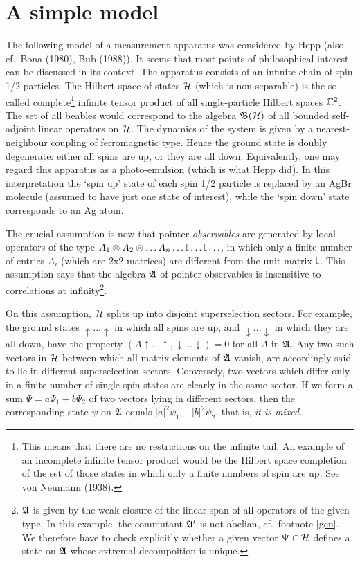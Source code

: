 \documentclass[12pt,titlepage]{article}
\newcommand{\ps}{\psi}
\newcommand{\A}{\frak A}
\newcommand{\B}{\frak B}
\renewcommand{\H}{\mbox{$\cal H$}}
\newcommand{\fn}{\footnote}
\newcommand{\ot}{\otimes}
\newcommand{\Up}{\uparrow\ldots\uparrow}
\newcommand{\Do}{\downarrow\ldots\downarrow}
\begin{document}
\section{A simple model}
The following model of a measurement apparatus was considered by Hepp (also
cf.\ Bona
(1980), Bub (1988)). It seems that most points of philosophical interest can be
discussed in its
context. The apparatus consists of an infinite chain of spin 1/2 particles.
The Hilbert space of states $\H$ (which is  non-separable) is the so-called
complete\fn{This means
that there are no restrictions on the infinite tail. An example of an
incomplete infinite tensor
product would be the Hilbert space completion of the set of those states in
which only a finite
numbers of spin are up. See von Neumann (1938).}
 infinite tensor product of  all single-particle Hilbert spaces ${\Bbb C}^2$.
The
set of all beables would correspond to the algebra $\B(\H)$ of all bounded
self-adjoint linear
operators on $\H$.
 The dynamics of the system is given by  a nearest-neighbour coupling
of ferromagnetic type. Hence the ground state is doubly degenerate: either all
spins are up, or they
are all down.
Equivalently, one may regard this apparatus as a photo-emulsion (which is what
Hepp did).
In this interpretation the `spin up'  state of each spin 1/2 particle is
replaced by an AgBr
molecule (assumed to have just one state of interest), while the `spin down'
state corresponds to an
Ag atom.

The crucial assumption is now that pointer {\em observables} are generated by
local operators of the
type $A_1\ot A_2\ot\ldots A_n\ldots {\Bbb I}\ldots {\Bbb I}\ldots$, in which
only a finite number of
entries $A_i$ (which are 2x2 matrices) are different from the unit matrix $\Bbb
I$.
This assumption says that the algebra $\A$ of pointer observables is
insensitive to correlations at
infinity\fn{$\A$ is given by the weak closure of the linear span of all
operators of the given
type. In this example, the commutant $\A'$ is not abelian, cf.\ footnote
\ref{gen}. We therefore
have to check explicitly whether a given vector $\Psi\in\H$ defines a state on
$\A$ whose extremal
decompoition is unique.}.

On this assumption, $\H$ splits up into disjoint superselection sectors. For
example, the ground
states $\Up$ in which all spins are up, and $\Do$ in which they are all down,
have the property $(A\Up,\Do)=0$ for all $A$ in $\A$. Any two such vectors in
$\H$ between which all
matrix elements of $\A$ vanish, are accordingly said to lie in different
superselection sectors.
Conversely, two vectors which differ only in a finite number of single-spin
states are clearly in
the same sector. If we form a sum $\Psi=a\Psi_1+b\Psi_2$ of two vectors lying
in different sectors,
then  the corresponding state $\ps$ on $\A$ equals $|a|^2\ps_1+|b|^2\ps_2$,
that is, {\em it is
mixed}.
\end{document}

